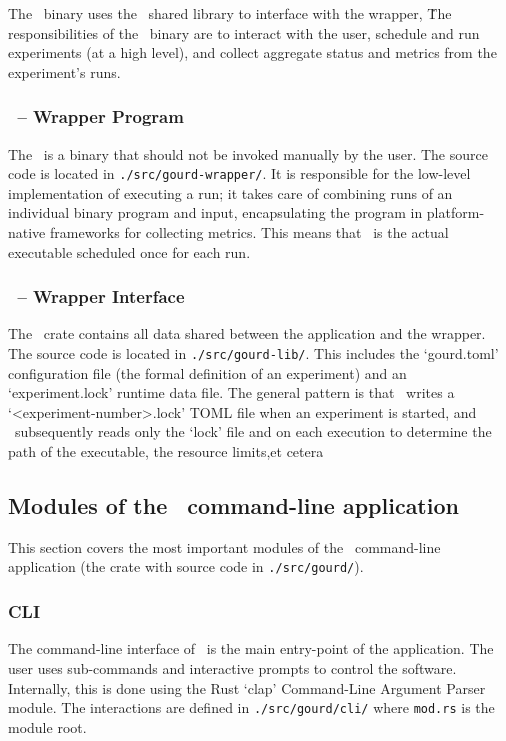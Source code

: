 The \gourd\ binary uses the \gourdlib\ shared library to interface with
the wrapper, \gourdwrap\.
The responsibilities of the \gourd\ binary are to interact with the user,
schedule and run experiments (at a high level), and collect aggregate
status and metrics from the experiment's runs.

\subsubsection{\gourdwrap\ -- Wrapper Program}

The \gourdwrap\ is a binary that should not be invoked manually by the user.
The source code is located in \verb|./src/gourd-wrapper/|.
It is responsible for the low-level implementation of executing a run;
it takes care of combining runs of an individual binary program and input,
encapsulating the program in platform-native frameworks for collecting metrics.
This means that \gourdwrap\ is the actual executable scheduled once for each run.

\subsubsection{\gourdlib\ -- Wrapper Interface}

The \gourdlib\ crate contains all data shared between the application and the wrapper.
The source code is located in \verb|./src/gourd-lib/|.
This includes the `gourd.toml' configuration file (the formal definition of an experiment)
and an `experiment.lock' runtime data file.
The general pattern is that \gourd\ writes a `<experiment-number>.lock' TOML file when
an experiment is started, and \gourdwrap\ subsequently reads only the `lock' file and
on each execution to determine the path of the executable, the resource limits,et cetera


\subsection{Modules of the \gourd\ command-line application}

This section covers the most important modules of the \gourd\ command-line application
(the crate with source code in \verb|./src/gourd/|).

\subsubsection{CLI}
The command-line interface of \gourd\ is the main entry-point of the
application.
The user uses sub-commands and interactive prompts to control
the software.
Internally, this is done using the Rust `clap' Command-Line
Argument Parser module.
The interactions are defined in
\verb|./src/gourd/cli/| where \verb|mod.rs| is the module root.

